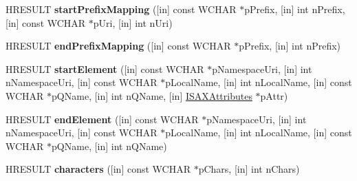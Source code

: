 \begin{DoxyCompactItemize}
\mbox{\label{interface_m_s_x_m_l2_1_1_i_s_a_x_content_handler_af135118b53eb5864490608b08ca4798e}} 
H\+R\+E\+S\+U\+LT {\bfseries start\+Prefix\+Mapping} (\mbox{[}in\mbox{]} const W\+C\+H\+AR $\ast$p\+Prefix, \mbox{[}in\mbox{]} int n\+Prefix, \mbox{[}in\mbox{]} const W\+C\+H\+AR $\ast$p\+Uri, \mbox{[}in\mbox{]} int n\+Uri)
\item 
\mbox{\label{interface_m_s_x_m_l2_1_1_i_s_a_x_content_handler_a06c723c48ab35b9ce3ad0b7c38b53bd6}} 
H\+R\+E\+S\+U\+LT {\bfseries end\+Prefix\+Mapping} (\mbox{[}in\mbox{]} const W\+C\+H\+AR $\ast$p\+Prefix, \mbox{[}in\mbox{]} int n\+Prefix)
\item 
\mbox{\label{interface_m_s_x_m_l2_1_1_i_s_a_x_content_handler_a11c994d3615fa625da53f6e561e32a46}} 
H\+R\+E\+S\+U\+LT {\bfseries start\+Element} (\mbox{[}in\mbox{]} const W\+C\+H\+AR $\ast$p\+Namespace\+Uri, \mbox{[}in\mbox{]} int n\+Namespace\+Uri, \mbox{[}in\mbox{]} const W\+C\+H\+AR $\ast$p\+Local\+Name, \mbox{[}in\mbox{]} int n\+Local\+Name, \mbox{[}in\mbox{]} const W\+C\+H\+AR $\ast$p\+Q\+Name, \mbox{[}in\mbox{]} int n\+Q\+Name, \mbox{[}in\mbox{]} \hyperlink{interface_m_s_x_m_l2_1_1_i_s_a_x_attributes}{I\+S\+A\+X\+Attributes} $\ast$p\+Attr)
\item 
\mbox{\label{interface_m_s_x_m_l2_1_1_i_s_a_x_content_handler_a1d200519c5037d0089f04bbe765d4e7d}} 
H\+R\+E\+S\+U\+LT {\bfseries end\+Element} (\mbox{[}in\mbox{]} const W\+C\+H\+AR $\ast$p\+Namespace\+Uri, \mbox{[}in\mbox{]} int n\+Namespace\+Uri, \mbox{[}in\mbox{]} const W\+C\+H\+AR $\ast$p\+Local\+Name, \mbox{[}in\mbox{]} int n\+Local\+Name, \mbox{[}in\mbox{]} const W\+C\+H\+AR $\ast$p\+Q\+Name, \mbox{[}in\mbox{]} int n\+Q\+Name)
\item 
\mbox{\label{interface_m_s_x_m_l2_1_1_i_s_a_x_content_handler_a214ac446e1ccb60654436865920cf5df}} 
H\+R\+E\+S\+U\+LT {\bfseries characters} (\mbox{[}in\mbox{]} const W\+C\+H\+AR $\ast$p\+Chars, \mbox{[}in\mbox{]} int n\+Chars)
\item 
\mbox{\label{interface_m_s_x_m_l2_1_1_i_s_a_x_content_handler_a231a97139131cdd6d2b2873b7efc240b}} 

\end{DoxyCompactItemize}
